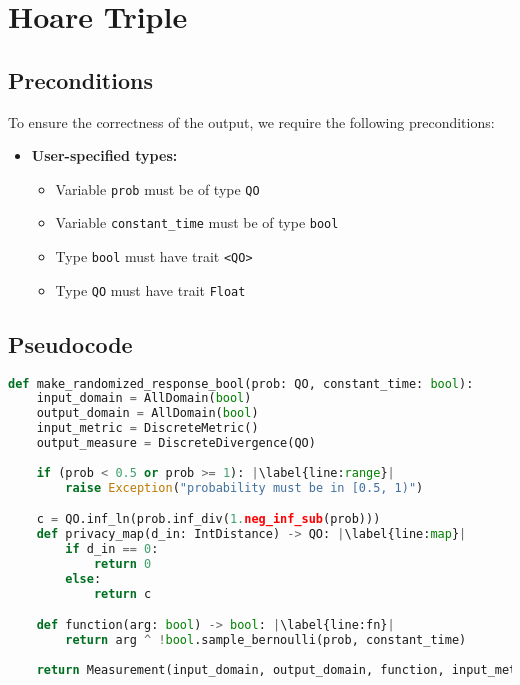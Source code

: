 \documentclass{article}
\begin{document}
\section{Hoare Triple}

\subsection*{Preconditions}
To ensure the correctness of the output, we require the following preconditions:

\begin{itemize}
    \item \textbf{User-specified types:}
    \begin{itemize}
        \item Variable \texttt{prob} must be of type \texttt{QO}
        \item Variable \texttt{constant\_time} must be of type \texttt{bool}
        \item Type \texttt{bool} must have trait \texttt{<QO>}
        \item Type \texttt{QO} must have trait \texttt{Float}
    \end{itemize}
\end{itemize}

\subsection*{Pseudocode}
\begin{lstlisting}[language=Python, escapechar=|]
def make_randomized_response_bool(prob: QO, constant_time: bool):
    input_domain = AllDomain(bool)
    output_domain = AllDomain(bool)
    input_metric = DiscreteMetric()
    output_measure = DiscreteDivergence(QO)
    
    if (prob < 0.5 or prob >= 1): |\label{line:range}|
        raise Exception("probability must be in [0.5, 1)")

    c = QO.inf_ln(prob.inf_div(1.neg_inf_sub(prob)))
    def privacy_map(d_in: IntDistance) -> QO: |\label{line:map}|
        if d_in == 0:
            return 0
        else: 
            return c

    def function(arg: bool) -> bool: |\label{line:fn}|
        return arg ^ !bool.sample_bernoulli(prob, constant_time)
    
    return Measurement(input_domain, output_domain, function, input_metric, output_measure, privacy_map)
\end{lstlisting}
\end{document}

